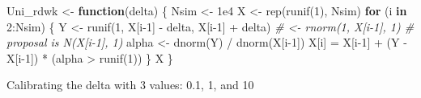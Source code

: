 \documentclass[
]{article}
\newenvironment{Shaded}{\begin{snugshade}}{\end{snugshade}}
\newcommand{\CommentTok}[1]{\textcolor[rgb]{0.56,0.35,0.01}{\textit{#1}}}
\newcommand{\ControlFlowTok}[1]{\textcolor[rgb]{0.13,0.29,0.53}{\textbf{#1}}}
\newcommand{\DecValTok}[1]{\textcolor[rgb]{0.00,0.00,0.81}{#1}}
\newcommand{\FloatTok}[1]{\textcolor[rgb]{0.00,0.00,0.81}{#1}}
\newcommand{\FunctionTok}[1]{\textcolor[rgb]{0.00,0.00,0.00}{#1}}
\newcommand{\NormalTok}[1]{#1}
\newcommand{\OtherTok}[1]{\textcolor[rgb]{0.56,0.35,0.01}{#1}}
\newcommand{\SpecialCharTok}[1]{\textcolor[rgb]{0.00,0.00,0.00}{#1}}
\begin{document}
\begin{Shaded}
\begin{Highlighting}[]
\NormalTok{Uni\_rdwk }\OtherTok{\textless{}{-}} \ControlFlowTok{function}\NormalTok{(delta) \{}
\NormalTok{  Nsim }\OtherTok{\textless{}{-}} \FloatTok{1e4}
\NormalTok{  X }\OtherTok{\textless{}{-}} \FunctionTok{rep}\NormalTok{(}\FunctionTok{runif}\NormalTok{(}\DecValTok{1}\NormalTok{), Nsim)}
  \ControlFlowTok{for}\NormalTok{ (i }\ControlFlowTok{in} \DecValTok{2}\SpecialCharTok{:}\NormalTok{Nsim) \{}
\NormalTok{    Y }\OtherTok{\textless{}{-}} \FunctionTok{runif}\NormalTok{(}\DecValTok{1}\NormalTok{, X[i}\DecValTok{{-}1}\NormalTok{] }\SpecialCharTok{{-}}\NormalTok{ delta, X[i}\DecValTok{{-}1}\NormalTok{] }\SpecialCharTok{+}\NormalTok{ delta)}
    \CommentTok{\# \textless{}{-} rnorm(1, X[i{-}1], 1)         \# proposal is N(X[i{-}1], 1) }
\NormalTok{    alpha }\OtherTok{\textless{}{-}} \FunctionTok{dnorm}\NormalTok{(Y) }\SpecialCharTok{/} \FunctionTok{dnorm}\NormalTok{(X[i}\DecValTok{{-}1}\NormalTok{])}
\NormalTok{    X[i] }\OtherTok{=}\NormalTok{ X[i}\DecValTok{{-}1}\NormalTok{] }\SpecialCharTok{+}\NormalTok{ (Y }\SpecialCharTok{{-}}\NormalTok{ X[i}\DecValTok{{-}1}\NormalTok{]) }\SpecialCharTok{*}\NormalTok{ (alpha }\SpecialCharTok{\textgreater{}} \FunctionTok{runif}\NormalTok{(}\DecValTok{1}\NormalTok{))}
\NormalTok{  \}}
\NormalTok{  X}
\NormalTok{\}}
\end{Highlighting}
\end{Shaded}

Calibrating the delta with 3 values: 0.1, 1, and 10
\end{document}
